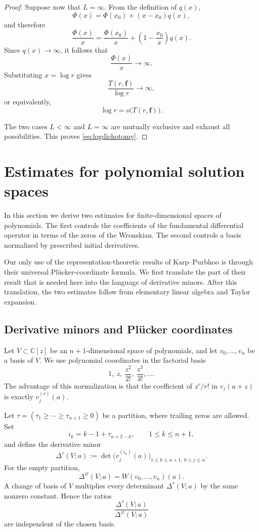 \documentclass[12pt,letterpaper,reqno]{amsart}
\theoremstyle{definition}
\numberwithin{equation}{section}
\newcommand{\C}{\mathbb C}
\newcommand{\fv}{\bm f}
\begin{document}
\begin{proof}
Suppose now that \(L=\infty\). From the definition of \(q(x)\),
\[
\Phi(x)
=
\Phi(x_0)+(x-x_0)q(x),
\]
and therefore
\[
\frac{\Phi(x)}{x}
=
\frac{\Phi(x_0)}{x}
+
\left(1-\frac{x_0}{x}\right)q(x).
\]
Since \(q(x)\to\infty\), it follows that
\[
\frac{\Phi(x)}{x}\longrightarrow\infty.
\]
Substituting \(x=\log r\) gives
\[
\frac{T(r,\fv)}{\log r}\longrightarrow\infty,
\]
or equivalently,
\[
\log r=o\bigl(T(r,\fv)\bigr).
\]

The two cases \(L<\infty\) and \(L=\infty\) are mutually exclusive and
exhaust all possibilities. This proves \eqref{eq:logdichotomy}.
\end{proof}



\section{Estimates for polynomial solution spaces}\label{sec:algebra}

In this section we derive two estimates for finite-dimensional spaces of
polynomials. The first controls the coefficients of the fundamental
differential operator in terms of the zeros of the Wronskian. The second
controls a basis normalized by prescribed initial derivatives.

Our only use of the representation-theoretic results of Karp--Purbhoo
\cite{KP26} is through their universal Pl\"ucker-coordinate formula. We first translate the part of their
result that is needed here into the language of derivative minors. After
this translation, the two estimates follow from elementary linear algebra
and Taylor expansion.

\subsection{Derivative minors and Pl\"ucker coordinates}
\label{sec:derivative-minors}

Let \(V\subset\C[z]\) be an \({n+1}\)-dimensional space of polynomials, and
let \(v_0,\ldots,v_{n}\) be a basis of \(V\). We use polynomial
coordinates in the factorial basis
\[
1,\ z,\ \frac{z^2}{2!},\ \frac{z^3}{3!},\ldots.
\]
The advantage of this normalization is that the coefficient of
\(z^r/r!\) in \(v_j(a+z)\) is exactly \(v_j^{(r)}(a)\).

Let
$
\tau=(\tau_1\geq\cdots\geq\tau_{n+1}\geq0)
$
be a partition, where trailing zeros are allowed. Set
\[
i_k=k-1+\tau_{n+2-k},
\qquad 1\leq k\leq n+1,
\]
and define the derivative minor
\begin{equation}\label{eq:derivative-minor}
 \Delta^\tau(V;a)
 :=
 \det\bigl(v_j^{(i_k)}(a)\bigr)_{
                  1\leq k\leq n+1,\ 0\leq j\leq n}.
\end{equation}
For the empty partition,
\[
\Delta^\varnothing(V;a)
=
W(v_0,\ldots,v_{n})(a).
\]
A change of basis of \(V\) multiplies every determinant
\(\Delta^\tau(V;a)\) by the same nonzero constant. Hence the ratios
\[
\frac{\Delta^\tau(V;a)}
     {\Delta^\varnothing(V;a)}
\]
are independent of the chosen basis.
\end{document}

